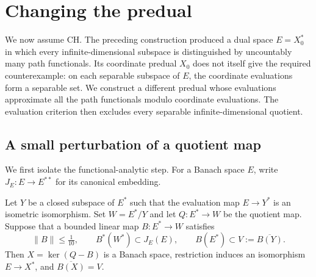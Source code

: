 \section{Changing the predual}\label{sec:predual}

We now assume CH. The preceding construction produced a dual space
$E=X_0^*$ in which every infinite-dimensional subspace is distinguished by
uncountably many path functionals. Its coordinate predual $X_0$ does not
itself give the required counterexample: on each separable subspace of $E$,
the coordinate evaluations form a separable set. We construct a different
predual whose evaluations approximate all the path functionals modulo
coordinate evaluations. The evaluation criterion then excludes every
separable infinite-dimensional quotient.

\subsection{A small perturbation of a quotient map}

We first isolate the functional-analytic step. For a Banach space $E$,
write $J_E:E\to E^{**}$ for its canonical embedding.

\begin{lemma}\label{twist:lemma}
Let $Y$ be a closed subspace of $E^*$ such that the evaluation map
$E\to Y^*$ is an isometric isomorphism. Set $W=E^*/Y$ and let
$Q:E^*\to W$ be the quotient map. Suppose that a bounded linear map
$B:E^*\to W$ satisfies
\[
 \|B\|\le\tfrac1{10},\qquad B^*(W^*)\subset J_E(E),\qquad
 B(E^*)\subset V:=\overline{B(Y)}.
\]
Then $X=\ker(Q-B)$ is a Banach space, restriction induces an isomorphism
$E\to X^*$, and $\overline{B(X)}=V$.
\end{lemma}

